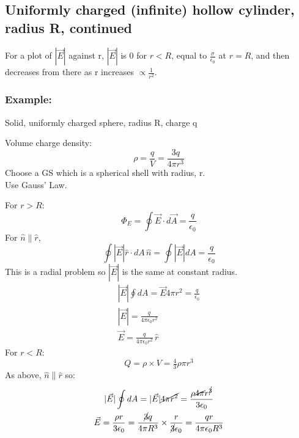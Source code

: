 \documentclass[a4paper, 11pt, fleqn, normalem]{report}
\begin{document}
\chapter{}
\section{Uniformly charged (infinite) hollow cylinder, radius R, continued}

For a plot of $|\vec{E}|$ against r, $|\vec{E}|$ is 0 for $r < R$, equal to $\frac{\sigma}{\epsilon_{0}}$ at $r = R$, and then decreases from there as r increases $\propto \frac{1}{r^{2}}$.

\subsection{Example:}
Solid, uniformly charged sphere, radius R, charge q

Volume charge density:
\begin{equation*}
    \rho = \frac{q}{V} = \frac{3q}{4\pi r^{3}}
\end{equation*}
Choose a GS which is a spherical shell with radius, r. \\
Use Gauss' Law.

For $r > R$:
\begin{equation*}
    \Phi_{E} = \oint \vec{E} \cdot d\vec{A} = \frac{q}{\epsilon_{0}}
\end{equation*}
For $\hat{n} \parallel \hat{r}$,
\begin{equation*}
    \oint |\vec{E}| \hat{r} \cdot dA \, \hat{n} = \oint |\vec{E}|dA = \frac{q}{\epsilon_{0}}
\end{equation*}
This is a radial problem so $|\vec{E}|$ is the same at constant radius.
\begin{gather*}
    |\vec{E}| \oint dA = \vec{E} 4\pi r^{2} = \frac{q}{\epsilon_{0}} \\
    |\vec{E}| = \frac{q}{4\pi\epsilon_{0}r^{2}} \\
    \vec{E} = \frac{q}{4\pi\epsilon_{0}r^{2}} \, \hat{r}
\end{gather*}
For $r < R$:
\begin{equation*}
    Q = \rho \times V = \tfrac{4}{3}\rho\pi r^{3}
\end{equation*}
As above, $\hat{n} \parallel \hat{r}$ so:
\begin{gather*}
    |\vec{E}| \oint dA = |\vec{E}| \cancel{4\pi r^{2}} = \frac{\rho \cancel{4\pi}r^{\cancel{3}}}{3\epsilon_{0}} \\
    \vec{E} = \frac{\rho r}{3\epsilon_{0}} = \frac{\cancel{3}q}{4\pi R^{3}} \times \frac{r}{\cancel{3}\epsilon_{0}} = \frac{qr}{4\pi \epsilon_{0} R^{3}}
\end{gather*}
\end{document}
